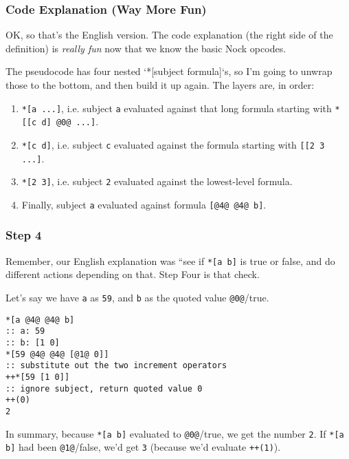 \documentclass[twoside]{article}
\begin{document}
\subsubsection{Code Explanation (Way More Fun)}

OK, so that's the English version. The code explanation (the right side of the definition) is \emph{really fun} now that we know the basic Nock opcodes.

The pseudocode has four nested `*[subject formula]`s, so I'm going to unwrap those to the bottom, and then build it up again. The layers are, in order:

\begin{enumerate}
  \item  \lstinline[style=inlinecode]{*[a ...]}, i.e. subject \lstinline[style=inlinecode]{a} evaluated against that long formula starting with \lstinline[style=inlinecode]{*[[c d] @0@ ...]}.
  \item  \lstinline[style=inlinecode]{*[c d]}, i.e. subject \lstinline[style=inlinecode]{c} evaluated against the formula starting with \lstinline[style=inlinecode]{[[2 3 ...]}.
  \item  \lstinline[style=inlinecode]{*[2 3]}, i.e. subject \lstinline[style=inlinecode]{2} evaluated against the lowest-level formula.
  \item  Finally, subject \lstinline[style=inlinecode]{a} evaluated against formula \lstinline[style=inlinecode]{[@4@ @4@ b]}.
\end{enumerate}

\subsubsection{Step 4}

Remember, our English explanation was ``see if \lstinline[style=inlinecode]{*[a b]} is true or false, and do different actions depending on that. Step Four is that check.

Let's say we have \lstinline[style=inlinecode]{a} as \lstinline[style=inlinecode]{59}, and \lstinline[style=inlinecode]{b} as the quoted value \lstinline[style=inlinecode]{@0@}/true.

\begin{lstlisting}[style=listingcode]
*[a @4@ @4@ b]
:: a: 59
:: b: [1 0]
*[59 @4@ @4@ [@1@ 0]]
:: substitute out the two increment operators
++*[59 [1 0]]
:: ignore subject, return quoted value 0
++(0)
2
\end{lstlisting}

In summary, because \lstinline[style=inlinecode]{*[a b]} evaluated to \lstinline[style=inlinecode]{@0@}/true, we get the number \lstinline[style=inlinecode]{2}. If \lstinline[style=inlinecode]{*[a b]} had been \lstinline[style=inlinecode]{@1@}/false, we'd get \lstinline[style=inlinecode]{3} (because we'd evaluate \lstinline[style=inlinecode]{++(1)}).
\end{document}
